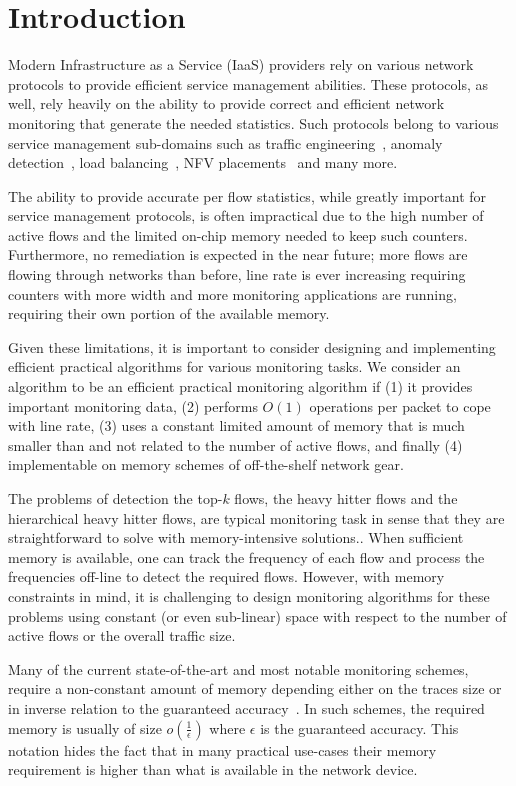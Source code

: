 \chapter{Introduction}
\label{chap:intro}

Modern Infrastructure as a Service (IaaS) providers rely on various network protocols to provide efficient service management abilities. These protocols, as well, rely heavily on the ability to provide correct and efficient network monitoring that generate the needed statistics. Such protocols belong to various service management sub-domains such as traffic engineering~\cite{microte}, anomaly detection~\cite{Moraney2016}, load balancing~\cite{networkLB}, NFV placements~\cite{NFV-dor} and many more.

The ability to provide accurate per flow statistics, while greatly important for service management protocols, is often impractical due to the high number of active flows and the limited on-chip memory needed to keep such counters. Furthermore, no remediation is expected in the near future; more flows are flowing through networks than before, line rate is ever increasing requiring counters with more width and more monitoring applications are running, requiring their own portion of the available memory. 

Given these limitations, it is important to consider designing and implementing efficient practical algorithms for various monitoring tasks. We consider an algorithm to be an efficient practical monitoring algorithm if (1) it provides important monitoring data, (2) performs $O(1)$ operations per packet to cope with line rate, (3) uses a constant limited amount of memory that is much smaller than and not related to the number of active flows, and finally (4) implementable on memory schemes of off-the-shelf network gear.

The problems of detection the top-$k$ flows, the heavy hitter flows and the hierarchical heavy hitter flows, are typical monitoring task in sense that they are straightforward to solve with memory-intensive solutions.. When sufficient memory is available, one can track the frequency of each flow and process the frequencies off-line to detect the required flows. However, with memory constraints in mind, it is challenging to design monitoring algorithms for these problems using constant (or even sub-linear) space with respect to the number of active flows or the overall traffic size.

Many of the current state-of-the-art and most notable monitoring schemes, require a non-constant amount of memory depending either on the traces size or in inverse relation to the guaranteed accuracy~\cite{slidingHH,metwally2005efficient,SpaceSaving,Ben-Basat2017}. In such schemes, the required memory is usually of size $o(\frac{1}{\epsilon})$ where $\epsilon$ is the guaranteed accuracy. This notation  hides the fact that in many practical use-cases their memory requirement is  higher than what is available in the network device.

